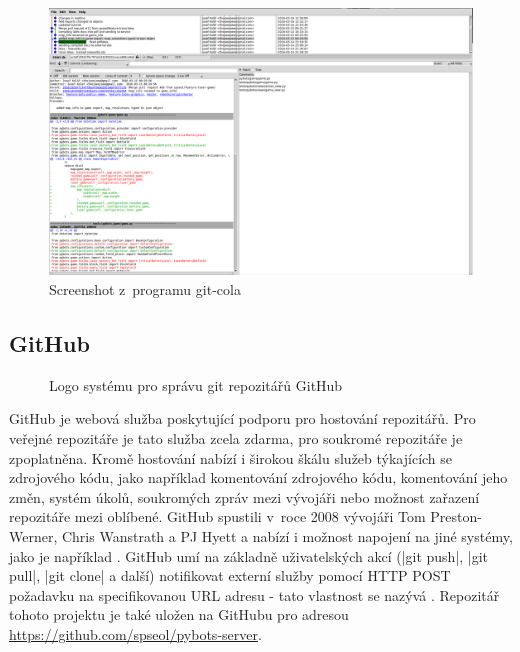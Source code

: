 \begin{figure}[H]
	\centering
	\begin{minipage}{.9\textwidth}
 		\centering
 		\includegraphics[width=.9\textwidth]{assets/git-cola-screenshot}
 		\caption{Screenshot z~programu git-cola}
 		\label{fig:git-cola}
 	\end{minipage}
\end{figure}

\subsection{GitHub}

\begin{figure}
 	\centering
 	
 	\caption{Logo systému pro správu git repozitářů GitHub}
\end{figure}

GitHub je webová služba poskytující podporu pro hostování  repozitářů. Pro veřejné repozitáře je tato služba zcela zdarma, pro soukromé repozitáře je zpoplatněna\cite{github-docs}. Kromě hostování nabízí i širokou škálu služeb týkajících se zdrojového kódu, jako například komentování zdrojového k\'{o}du, komentování jeho změn, systém úkolů, soukromých zpráv mezi vývojáři nebo možnost zařazení repozitáře mezi oblíbené. GitHub spustili v~roce 2008 vývojáři Tom Preston-Werner, Chris Wanstrath a PJ Hyett a nabízí i možnost napojení na jiné systémy, jako je například . GitHub umí na základně uživatelských akcí (\ic|git push|, \ic|git pull|, \ic|git clone| a další) notifikovat externí služby pomocí HTTP POST požadavku na specifikovanou URL adresu - tato vlastnost se nazývá . Repozitář tohoto projektu je také uložen na GitHubu pro adresou \url{https://github.com/spseol/pybots-server}.


